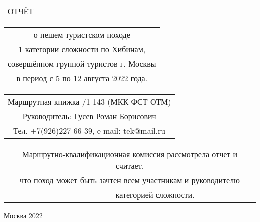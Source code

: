\begin{titlepage}
    \noindent\parbox{\linewidth}
    {
        \vspace{100pt}
        \Large
        \begin{center} \begin{tabular}{c}
            ОТЧЁТ\\
        \end{tabular}  \end{center}
    }
    \noindent\parbox{\linewidth}
    {
        \vspace{10pt}
        \large
        \begin{center} \begin{tabular}{c}
            о пешем туристском походе\\
            1 категории сложности по Хибинам,\\
            совершённом группой туристов г. Москвы\\
            в период с 5 по 12 августа 2022 года.
        \end{tabular}  \end{center}
    }
    \noindent\parbox{\linewidth}
    {
        \vspace{20pt}
        \large
        \begin{center} \begin{tabular}{c}
            Маршрутная книжка \textnumero1/1-143 (МКК ФСТ-ОТМ)\\
            Руководитель: Гусев Роман Борисович\\
            Тел. +7(926)227-66-39, e-mail: tek@mail.ru\\
        \end{tabular}  \end{center}
    }
    \noindent\parbox{\linewidth}
    {
        \vspace{20pt}
        \normalsize
        \begin{center} \begin{tabular}{c}
            Маршрутно-квалификационная комиссия рассмотрела отчет и считает,\\
            что поход может быть зачтен всем участникам и руководителю\\
            \_\_\_\_\_\_\_\_ категорией сложности.
        \end{tabular}  \end{center}
    }
    \noindent\parbox{\linewidth}
    {
        \vspace{180pt}
        \large
        \begin{center}
            Москва 2022
        \end{center}
    }
\end{titlepage}

\shipout\null
